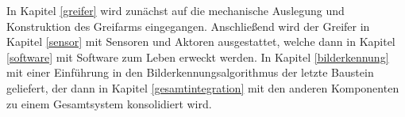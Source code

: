 In Kapitel \ref{greifer} wird zunächst auf die mechanische Auslegung und Konstruktion des Greifarms eingegangen. Anschließend wird der Greifer in Kapitel \ref{sensor} mit Sensoren und Aktoren ausgestattet, welche dann in Kapitel \ref{software} mit Software zum Leben erweckt werden. In Kapitel \ref{bilderkennung} mit einer Einführung in den Bilderkennungsalgorithmus der letzte Baustein geliefert, der dann in Kapitel \ref{gesamtintegration} mit den anderen Komponenten zu einem Gesamtsystem konsolidiert wird. 